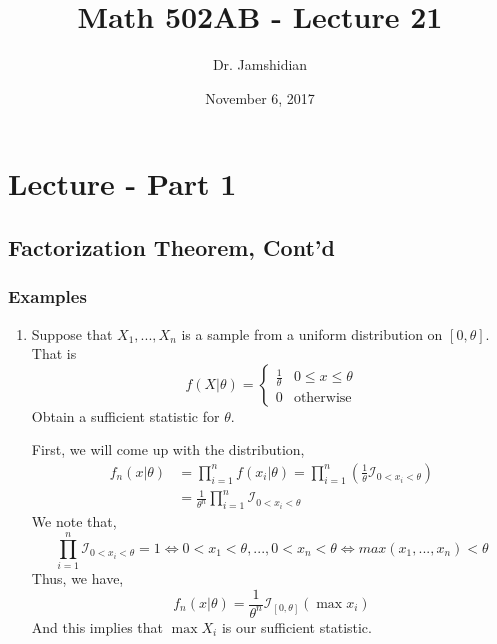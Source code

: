 \documentclass{article}
\title{Math 502AB - Lecture 21}
\author{Dr. Jamshidian}
\date{November 6, 2017}
\begin{document}
\maketitle

\section{Lecture - Part 1}

\subsection{Factorization Theorem, Cont'd}
\subsubsection{Examples}
\begin{enumerate}
    \item Suppose that $X_1,...,X_n$ is a sample from a uniform distribution on $[0,\theta]$. That is
    \begin{equation*}
        f(X|\theta) = \begin{cases}
            \frac{1}{\theta} & 0 \leq x \leq \theta\\
            0 & \text{otherwise}
        \end{cases}
    \end{equation*}
    Obtain a sufficient statistic for $\theta$.

    First, we will come up with the distribution,
    \begin{equation*}
        \begin{split}
            f_n(x|\theta) &= \prod_{i=1}^n f(x_i|\theta) = \prod_{i=1}^n \left(\frac{1}{\theta} \mathcal{I}_{0 < x_i <\theta} \right)\\
            &= \frac{1}{\theta^n}\prod_{i=1}^n \mathcal{I}_{0<x_i<\theta}
        \end{split}
    \end{equation*}
    We note that,
    \begin{equation*}
        \prod_{i=1}^n \mathcal{I}_{0<x_i<\theta} = 1 \iff 0 < x_1 < \theta, ..., 0 < x_n < \theta \iff max(x_1,...,x_n) < \theta
    \end{equation*}
    Thus, we have,
    \begin{equation*}
        f_n(x|\theta) = \frac{1}{\theta^n}\mathcal{I}_{[0,\theta]}(\max x_i)
    \end{equation*}
    And this implies that $\max X_i$ is our sufficient statistic.


\end{enumerate}
\end{document}
